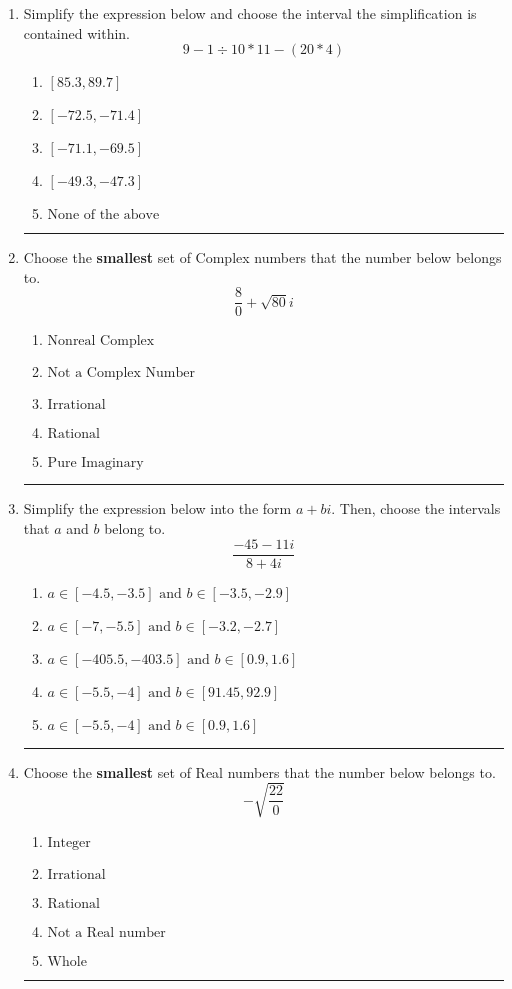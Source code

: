 \documentclass[14pt]{extbook}
\newcommand{\litem}[1]{\item#1\hspace*{-1cm}\rule{\textwidth}{0.4pt}}
\begin{document}
\begin{enumerate}
\litem{
Simplify the expression below and choose the interval the simplification is contained within.\[ 9 - 1 \div 10 * 11 - (20 * 4) \]\begin{enumerate}[label=\Alph*.]
\item \( [85.3, 89.7] \)
\item \( [-72.5, -71.4] \)
\item \( [-71.1, -69.5] \)
\item \( [-49.3, -47.3] \)
\item \( \text{None of the above} \)

\end{enumerate} }
\litem{
Choose the \textbf{smallest} set of Complex numbers that the number below belongs to.\[ \frac{8}{0}+\sqrt{80} i \]\begin{enumerate}[label=\Alph*.]
\item \( \text{Nonreal Complex} \)
\item \( \text{Not a Complex Number} \)
\item \( \text{Irrational} \)
\item \( \text{Rational} \)
\item \( \text{Pure Imaginary} \)

\end{enumerate} }
\litem{
Simplify the expression below into the form $a+bi$. Then, choose the intervals that $a$ and $b$ belong to.\[ \frac{-45 - 11 i}{8 + 4 i} \]\begin{enumerate}[label=\Alph*.]
\item \( a \in [-4.5, -3.5] \text{ and } b \in [-3.5, -2.9] \)
\item \( a \in [-7, -5.5] \text{ and } b \in [-3.2, -2.7] \)
\item \( a \in [-405.5, -403.5] \text{ and } b \in [0.9, 1.6] \)
\item \( a \in [-5.5, -4] \text{ and } b \in [91.45, 92.9] \)
\item \( a \in [-5.5, -4] \text{ and } b \in [0.9, 1.6] \)

\end{enumerate} }
\litem{
Choose the \textbf{smallest} set of Real numbers that the number below belongs to.\[ -\sqrt{\frac{22}{0}} \]\begin{enumerate}[label=\Alph*.]
\item \( \text{Integer} \)
\item \( \text{Irrational} \)
\item \( \text{Rational} \)
\item \( \text{Not a Real number} \)
\item \( \text{Whole} \)


\end{enumerate}}
\end{enumerate}
\end{document}
